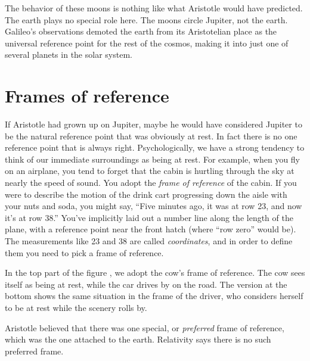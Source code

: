 The behavior of these moons is nothing like what Aristotle would have predicted. The earth
plays no special role here. The moons circle Jupiter, not the earth. Galileo's observations demoted
the earth from its Aristotelian place as the universal reference point for the rest of the cosmos,
making it into just one of several planets in the solar system.

\begin{figure}\label{fig:galileo-jovian-moons-sketch}
\end{figure}

\vfill\pagebreak

\section{Frames of reference}\label{sec:frames-of-reference}

If Aristotle had grown up on Jupiter, maybe he would have considered Jupiter to be the natural reference
point that was obviously at rest. In fact there is no one reference point that is always right. Psychologically,
we have a strong tendency to think of our immediate surroundings as being at rest. For example, when you fly
on an airplane, you tend to forget that the cabin is hurtling through the sky at nearly the speed of sound.
You adopt the \emph{frame of reference} of the cabin.
If you were to describe the motion of the drink cart progressing down the aisle with your nuts and soda,
you might say, ``Five minutes ago, it was at row 23, and now it's at row 38.'' You've implicitly laid out
a number line along the length of the plane, with a reference point near the front hatch (where ``row zero'' would be).
The measurements like 23 and 38 are called \emph{coordinates}, and in order to define them you need to pick
a frame of reference.

\begin{figure}\label{fig:cow-and-car}
\end{figure}

In the top part of the figure , we adopt the cow's frame of reference. The cow sees itself as being at rest,
while the car drives by on the road. The version at the bottom shows the same situation in
the frame of the driver,
who considers herself to be at rest while the scenery rolls by.

Aristotle believed that there was one special, or \emph{preferred} frame of reference, which was
the one attached to the earth. Relativity says there is no such
preferred frame.

